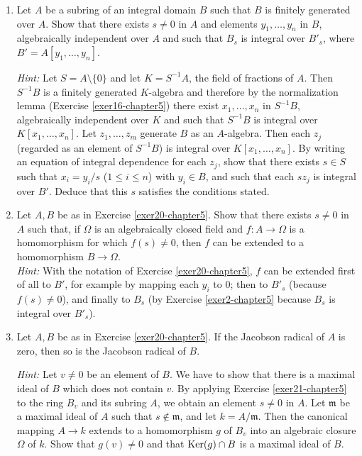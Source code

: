 \begin{enumerate}
    \item \label{exer20-chapter5}Let $A$ be a subring of an integral domain $B$ such that $B$ is finitely generated over $A$. Show that there exists $s \neq 0$ in $A$ and elements $y_1, \ldots, y_n$ in $B$, algebraically independent over $A$ and such that $B_s$ is integral over $B'_s$, where $B' = A[y_1, \ldots, y_n]$.
    
    \textit{Hint:} Let $S = A \setminus \{0\}$ and let $K = S^{-1}A$, the field of fractions of $A$. Then $S^{-1}B$ is a finitely generated $K$-algebra and therefore by the normalization lemma (Exercise \ref{exer16-chapter5}) there exist $x_1, \ldots, x_n$ in $S^{-1}B$, algebraically independent over $K$ and such that $S^{-1}B$ is integral over $K[x_1, \ldots, x_n]$. Let $z_1, \ldots, z_m$ generate $B$ as an $A$-algebra. Then each $z_j$ (regarded as an element of $S^{-1}B$) is integral over $K[x_1, \ldots, x_n]$. By writing an equation of integral dependence for each $z_j$, show that there exists $s \in S$ such that $x_i = y_i/s$ ($1 \leq i \leq n$) with $y_i \in B$, and such that each $sz_j$ is integral over $B'$. Deduce that this $s$ satisfies the conditions stated.

    \item \label{exer21-chapter5}Let $A, B$ be as in Exercise \ref{exer20-chapter5}. Show that there exists $s \neq 0$ in $A$ such that, if $\Omega$ is an algebraically closed field and $f \colon A \to \Omega$ is a homomorphism for which $f(s) \neq 0$, then $f$ can be extended to a homomorphism $B \to \Omega$.\\
    \textit{Hint:} With the notation of Exercise \ref{exer20-chapter5}, $f$ can be extended first of all to $B'$, for example by mapping each $y_i$ to $0$; then to $B'_s$ (because $f(s) \neq 0$), and finally to $B_s$ (by Exercise \ref{exer2-chapter5} because $B_s$ is integral over $B'_s$).

    \item \label{exer22-chapter5}Let $A, B$ be as in Exercise \ref{exer20-chapter5}. If the Jacobson radical of $A$ is zero, then so is the Jacobson radical of $B$.
    
    \textit{Hint:} Let $v \neq 0$ be an element of $B$. We have to show that there is a maximal ideal of $B$ which does not contain $v$. By applying Exercise \ref{exer21-chapter5} to the ring $B_v$ and its subring $A$, we obtain an element $s \neq 0$ in $A$. Let $\mathfrak{m}$ be a maximal ideal of $A$ such that $s \notin \mathfrak{m}$, and let $k = A/\mathfrak{m}$. Then the canonical mapping $A \to k$ extends to a homomorphism $g$ of $B_v$ into an algebraic closure $\Omega$ of $k$. Show that $g(v) \neq 0$ and that $\operatorname{Ker}(g) \cap B$ is a maximal ideal of $B$.


\end{enumerate}
